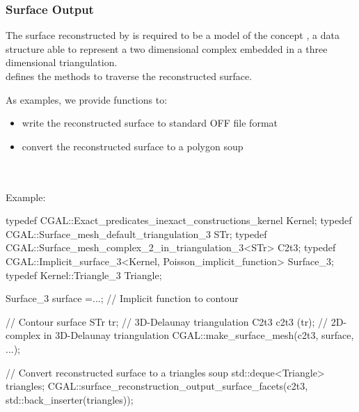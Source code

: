 \subsubsection{Surface Output}

The surface reconstructed by 
is required to be a model of the concept
,
a data structure able to represent a two dimensional
complex embedded in a three dimensional triangulation. \\
 defines the methods to traverse the reconstructed surface.

As examples, we provide functions to:

\begin{itemize}
\item write the reconstructed surface to standard OFF file format
\item convert the reconstructed surface to a polygon soup
\end{itemize}

  \\
  \\

Example:

\begin{ccExampleCode}
typedef CGAL::Exact_predicates_inexact_constructions_kernel Kernel;
typedef CGAL::Surface_mesh_default_triangulation_3 STr;
typedef CGAL::Surface_mesh_complex_2_in_triangulation_3<STr> C2t3;
typedef CGAL::Implicit_surface_3<Kernel, Poisson_implicit_function> Surface_3;
typedef Kernel::Triangle_3 Triangle;

Surface_3 surface =...; // Implicit function to contour

// Contour surface
STr tr; // 3D-Delaunay triangulation
C2t3 c2t3 (tr); // 2D-complex in 3D-Delaunay triangulation
CGAL::make_surface_mesh(c2t3, surface, ...);

// Convert reconstructed surface to a triangles soup
std::deque<Triangle> triangles;
CGAL::surface_reconstruction_output_surface_facets(c2t3, std::back_inserter(triangles));
\end{ccExampleCode}






